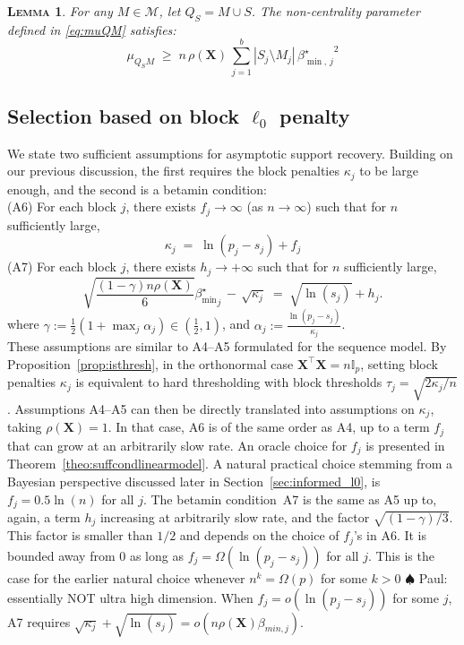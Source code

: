 \documentclass[aos]{imsart}
\theoremstyle{plain}
\newtheorem{lem}[thm]{\textsc{Lemma}}
\newcommand{\paul}[1]{{\small{\color{green} \sf $\spadesuit$ Paul: #1}}}
\newcommand{\I}{\mathbb{I}}
\newcommand{\M}{\mathcal{M}}
\newcommand{\bs}{\boldsymbol}
\begin{document}
\begin{lem}\label{lem:boundrho}
 For any $M\in\M$, let $Q_S=M \cup S$. The non-centrality parameter defined in \eqref{eq:muQM} satisfies: 
    \begin{equation}\label{eq:musmbound}
    \mu_{Q_SM}\; \geq \;n\,\rho(\bs X)\,\sum_{j=1}^b|S_j\setminus M_j|\,{\beta_{\min,\,j}^{\star}}^2
\end{equation}
\end{lem}



\subsection{Selection based on block $\ell_0$ penalty}
\label{ssec:regression_mainresult}

We state two sufficient assumptions for asymptotic support recovery. 
Building on our previous discussion, the first requires the block penalties $\kappa_j$ to be large enough,  
and the second is a betamin condition:\\[5pt] 
(A6) \quad For each block $j$, there exists $f_j\to \infty$ (as $n\to \infty$) such that for $n$ sufficiently large,
\begin{equation*}
    \kappa_j \;=\;\ln(p_j-s_j) + f_j
\end{equation*} 
(A7) \quad For each block $j$, there exists $h_j\to +\infty$ such that for $n$ sufficiently large,
    \begin{equation*}
        \sqrt{\frac{(1-\gamma) n\rho(\bs X)}{6}}{{\beta_{\min}^{\star}}_j} \,- \,\sqrt{\kappa_j} \;=\; \sqrt{\ln(s_j)} + h_j .
    \end{equation*}
where $\gamma:=\frac12(1+\max_j \alpha_j)\in (\tfrac12,1)$, and
$\alpha_j:=\frac{\ln(p_j-s_j)}{\kappa_j}$.\\[5pt] 
These assumptions are similar to A4--A5 formulated for the sequence model.
 By Proposition~\ref{prop:isthresh}, in the orthonormal 
 case $\bs X^{\top}\bs X=n\I_p$, setting block penalties $\kappa_j$ 
 is equivalent to hard thresholding with block thresholds $\tau_j=\sqrt{2 \kappa_j/n}$.
 Assumptions A4--A5 can then be directly translated into assumptions on $\kappa_j$, taking $\rho(\bs X)=1$. In that case, A6 is of the same order as A4, up to a term $f_j$ that can grow at an arbitrarily slow rate. An oracle choice for $f_j$ is presented in Theorem~\ref{theo:suffcondlinearmodel}. A natural practical choice stemming from a Bayesian perspective discussed later in Section~\ref{sec:informed_l0}, is $f_j=0.5\ln(n)$ for all $j$. The betamin condition~A7 is the same as A5 up to, again, a term $h_j$ increasing at arbitrarily slow rate, and the factor $\sqrt{(1-\gamma)/3}$. This factor is smaller than $1/2$ and depends on the choice of $f_j$'s in A6. It is bounded away from 0 as long as $f_j= \Omega(\ln(p_j-s_j))$ for all $j$. This is the case for the earlier natural choice whenever $n^k=\Omega(p)$ for some $k>0$ \paul{essentially NOT ultra high dimension}. When $f_j= o(\ln(p_j-s_j))$ for some $j$, A7 requires $\sqrt{\kappa_j}+\sqrt{\ln(s_j)} = o(n\rho(\bs X)\beta_{min,j})$.
\end{document}
